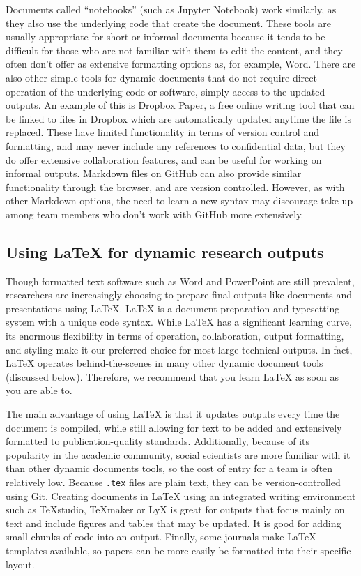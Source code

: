 Documents called ``notebooks''
(such as Jupyter Notebook)
work similarly,
as they also use the underlying code that create the document.
These tools are usually appropriate for short or informal documents
because it tends to be difficult for those who are not familiar with them to edit the content,
and they often don't offer as extensive formatting options as, for example, Word.
There are also other simple tools for dynamic documents
that do not require direct operation of the underlying code or software,
simply access to the updated outputs.
An example of this is Dropbox Paper,
a free online writing tool that can be linked to files in Dropbox
which are automatically updated anytime the file is replaced.
These have limited functionality in terms of version control and formatting,
and may never include any references to confidential data,
but they do offer extensive collaboration features,
and can be useful for working on informal outputs.
Markdown files on GitHub can also provide similar functionality through the browser,
and are version controlled.
However, as with other Markdown options, the need to learn a new syntax may
discourage take up among team members who don't work with GitHub more extensively.

\subsection{Using {\LaTeX} for dynamic research outputs}

Though formatted text software such as Word and PowerPoint are still prevalent,
researchers are increasingly choosing to prepare final outputs
like documents and presentations using {\LaTeX}.
{\LaTeX} is a document preparation and typesetting system with a unique code syntax.
While {\LaTeX} has a significant learning curve,
its enormous flexibility in terms of operation, collaboration, output formatting, and styling
make it our preferred choice for most large technical outputs.
In fact, {\LaTeX} operates behind-the-scenes in many other dynamic document tools (discussed below).
Therefore, we recommend that you learn {\LaTeX} as soon as you are able to.

The main advantage of using {\LaTeX} is that it updates outputs every time the document is compiled,
while still allowing for text to be added
and extensively formatted to publication-quality standards.
Additionally, because of its popularity in the academic community,
social scientists are more familiar with it than other dynamic documents tools,
so the cost of entry for a team is often relatively low.
Because \texttt{.tex} files are plain text,
they can be version-controlled using Git.
Creating documents in {\LaTeX} using an integrated writing environment such as TeXstudio, TeXmaker or LyX
is great for outputs that focus mainly on text
and include figures and tables that may be updated.
It is good for adding small chunks of code into an output.
Finally, some journals make {\LaTeX} templates available,
so papers can be more easily be formatted into their specific layout.

